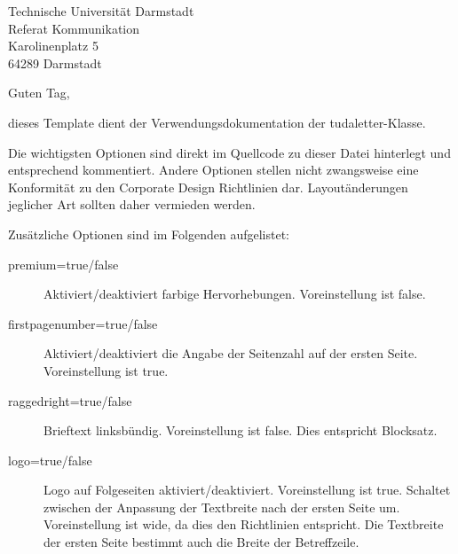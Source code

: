 \documentclass[
	german,%
	accentcolor=9c,%
	premium=true,%
]{tudaletter}
\begin{document}
\begin{letter}{%
	Technische Universität Darmstadt\\%
	Referat Kommunikation\\%
	Karolinenplatz 5\\%
	64289 Darmstadt}


\opening{Guten Tag,}
dieses Template dient der Verwendungsdokumentation der tudaletter-Klasse.

Die wichtigsten Optionen sind direkt im Quellcode zu dieser Datei hinterlegt und entsprechend kommentiert. Andere Optionen stellen nicht zwangsweise eine Konformität zu den Corporate Design Richtlinien dar. Layoutänderungen jeglicher Art sollten daher vermieden werden.

Zusätzliche Optionen sind im Folgenden aufgelistet:\\
\parbox{\linewidth}{
	\begin{description}
		\item[premium=true/false] Aktiviert/deaktiviert farbige Hervorhebungen. Voreinstellung ist false.
		\item[firstpagenumber=true/false] Aktiviert/deaktiviert die Angabe der Seitenzahl auf der ersten Seite. Voreinstellung ist true.
		\item[raggedright=true/false] Brieftext linksbündig. Voreinstellung ist false. Dies entspricht Blocksatz.
		\item[logo=true/false] Logo auf Folgeseiten aktiviert/deaktiviert. Voreinstellung ist true.
		      Schaltet zwischen der Anpassung der Textbreite nach der ersten Seite um. Voreinstellung ist wide, da dies den Richtlinien entspricht. Die Textbreite der ersten Seite bestimmt auch die Breite der Betreffzeile.
	\end{description}
}


\end{letter}
\end{document}
